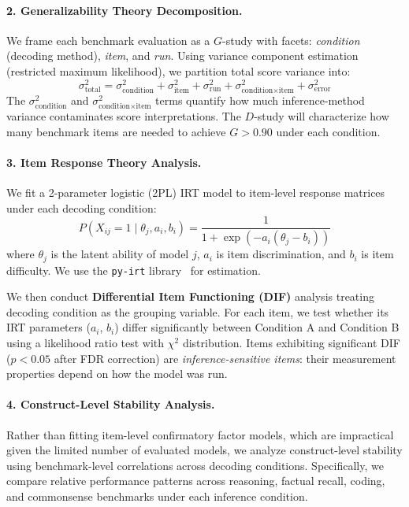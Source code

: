 \documentclass{article}
\begin{document}
\paragraph{2. Generalizability Theory Decomposition.}
We frame each benchmark evaluation as a $G$-study with facets: \emph{condition} (decoding method), \emph{item}, and \emph{run}. Using variance component estimation (restricted maximum likelihood), we partition total score variance into:
\begin{equation}
\sigma^2_{\text{total}} = \sigma^2_{\text{condition}} + \sigma^2_{\text{item}} + \sigma^2_{\text{run}} + \sigma^2_{\text{condition} \times \text{item}} + \sigma^2_{\text{error}}
\end{equation}
The $\sigma^2_{\text{condition}}$ and $\sigma^2_{\text{condition} \times \text{item}}$ terms quantify how much inference-method variance contaminates score interpretations. The $D$-study will characterize how many benchmark items are needed to achieve $G > 0.90$ under each condition.

\paragraph{3. Item Response Theory Analysis.}
We fit a 2-parameter logistic (2PL) IRT model to item-level response matrices under each decoding condition:
\begin{equation}
P(X_{ij} = 1 \mid \theta_j, a_i, b_i) = \frac{1}{1 + \exp(-a_i(\theta_j - b_i))}
\end{equation}
where $\theta_j$ is the latent ability of model $j$, $a_i$ is item discrimination, and $b_i$ is item difficulty. We use the \texttt{py-irt} library~\citep{lalor2019learning} for estimation.

We then conduct \textbf{Differential Item Functioning (DIF)} analysis treating decoding condition as the grouping variable. For each item, we test whether its IRT parameters ($a_i$, $b_i$) differ significantly between Condition A and Condition B using a likelihood ratio test with $\chi^2$ distribution. Items exhibiting significant DIF ($p < 0.05$ after FDR correction) are \emph{inference-sensitive items}: their measurement properties depend on how the model was run.

\paragraph{4. Construct-Level Stability Analysis.}

Rather than fitting item-level confirmatory factor models, which are impractical given the limited number of evaluated models, we analyze construct-level stability using benchmark-level correlations across decoding conditions. Specifically, we compare relative performance patterns across reasoning, factual recall, coding, and commonsense benchmarks under each inference condition.
\end{document}
